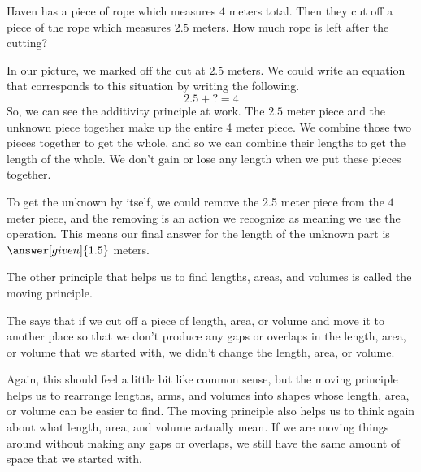 \documentclass{ximera}
\begin{document}
\begin{example}
Haven has a piece of rope which measures $4$ meters total. Then they cut off a piece of the rope which measures $2.5$ meters. How much rope is left after the cutting?
\begin{image}
\end{image}
In our picture, we marked off the cut at $2.5$ meters. We could write an equation that corresponds to this situation by writing the following.
\[
2.5 + ? = 4
\]
So, we can see the additivity principle at work. The $2.5$ meter piece and the unknown piece together make up the entire $4$ meter piece. We combine those two pieces together to get the whole, and so we can combine their lengths to get the length of the whole. We don't gain or lose any length when we put these pieces together. 

To get the unknown by itself, we could remove the 2.5 meter piece from the $4$ meter piece, and the removing is an action we recognize as meaning we use the  operation. This means our final answer for the length of the unknown part is $\answer[given]{1.5}$ meters.
\end{example}

The other principle that helps us to find lengths, areas, and volumes is called the moving principle.
\begin{definition}
The  says that if we cut off a piece of length, area, or volume and move it to another place so that we don't produce any gaps or overlaps in the length, area, or volume that we started with, we didn't change the length, area, or volume.
\end{definition}
Again, this should feel a little bit like common sense, but the moving principle helps us to rearrange lengths, arms, and volumes into shapes whose length, area, or volume can be easier to find. The moving principle also helps us to think again about what length, area, and volume actually mean. If we are moving things around without making any gaps or overlaps, we still have the same amount of space that we started with.
\end{document}
